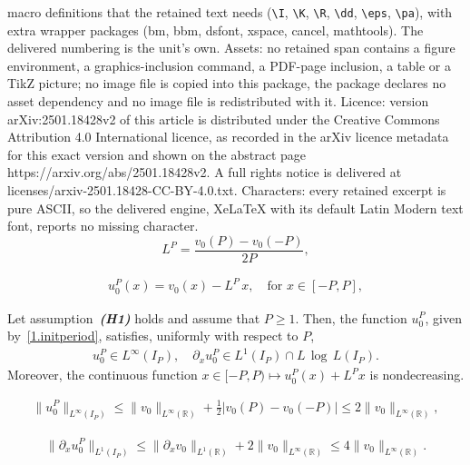 \documentclass[10pt,a4paper]{amsart}
\newcommand{\R}{\mathbb{R}}
\newcommand{\pa}{\partial}
\begin{document}
macro definitions that the retained text needs (\texttt{\textbackslash I}, \texttt{\textbackslash K}, \texttt{\textbackslash R}, \texttt{\textbackslash dd}, \texttt{\textbackslash eps}, \texttt{\textbackslash pa}), with extra wrapper packages (bm, bbm, dsfont, xspace, cancel, mathtools). The delivered numbering is the unit's own. Assets: no retained span contains a figure environment, a graphics-inclusion command, a PDF-page inclusion, a table or a TikZ picture; no image file is copied into this package, the package declares no asset dependency and no image file is redistributed with it. Licence: version arXiv:2501.18428v2 of this article is distributed under the Creative Commons Attribution 4.0 International licence, as recorded in the arXiv licence metadata for this exact version and shown on the abstract page https://arxiv.org/abs/2501.18428v2. A full rights notice is delivered at licenses/arxiv-2501.18428-CC-BY-4.0.txt. Characters: every retained excerpt is pure ASCII, so the delivered engine, XeLaTeX with its default Latin Modern text font, reports no missing character.
\begin{equation}\label{def.LP}
L^P=\frac{v_0(P)-v_0(-P)}{2P}, 
\end{equation} 

\begin{align}\label{1.initperiod}
    u^P_0(x) = v_0(x) - L^P \, x, \quad \mbox{for } x \in [-P,P],
\end{align}

\begin{lemma}\label{lem.init.perio.to.nonperiod}
Let assumption~\textbf{\emph{(H1)}} holds and assume that $P\ge 1$. Then, the function $u^P_0$, given by~\eqref{1.initperiod}, satisfies, uniformly with respect to $P$,
\begin{align*}
    u^P_0 \in L^\infty(I_P), \quad \pa_x u^P_0 \in L^1(I_P)\cap L\,\log \,L(I_P).
\end{align*}    
Moreover, the continuous function $x \in [-P,P)  \mapsto u^P_0(x) + L^Px$ is nondecreasing.
\end{lemma}

\begin{align}\label{estimationLinP}
    \|u^P_0\|_{L^\infty(I_P)}\leq \|v_0\|_{L^\infty(\R)} + \frac12 \left|v_0(P)-v_0(-P)\right|\leq 2\|v_0\|_{L^\infty(\R)},
\end{align}

\begin{align}\label{estimationL1P}
    \|\pa_x u^P_0\|_{L^1(I_P)} \leq \|\pa_x v_0\|_{L^1(\R)} + 2\|v_0\|_{L^\infty(\R)} \le  4\|v_0\|_{L^\infty(\R)}. 
\end{align}
\end{document}
